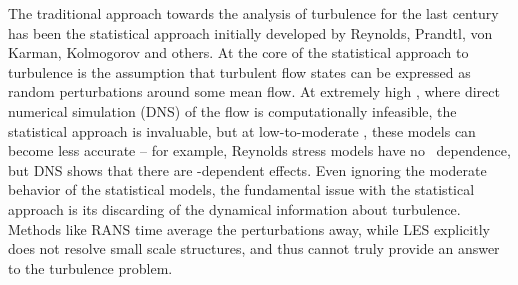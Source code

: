 The traditional approach towards the analysis of turbulence for the last century has been the statistical approach initially developed by Reynolds, Prandtl, von Karman, Kolmogorov and others. At the core of the statistical approach to turbulence is the assumption that turbulent flow states can be expressed as random perturbations around some mean flow. At extremely high \ReN, where direct numerical simulation (DNS) of the flow is computationally infeasible, the statistical approach is invaluable, but at low-to-moderate \ReN, these models can become less accurate -- for example, Reynolds stress models have no \ReN~dependence, but DNS shows that there are \ReN-dependent effects. Even ignoring the moderate \ReN behavior of the statistical models, the fundamental issue with the statistical approach is its discarding of the dynamical information about turbulence. Methods like RANS time average the perturbations away, while LES explicitly does not resolve small scale structures, and thus cannot truly provide an answer to the turbulence problem. \\

